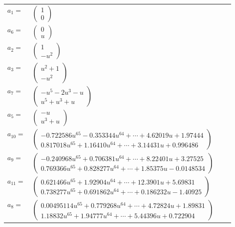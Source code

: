 \documentclass[1p]{elsarticle_modified}
\theoremstyle{definition}
\begin{document}
\begin{tabular}{m{7pt} m{180pt} m{7pt} m{180pt} }
\flushright $a_{1}=$&$\begin{pmatrix}1\\0\end{pmatrix}$ \\
\flushright $a_{6}=$&$\begin{pmatrix}0\\u\end{pmatrix}$ \\
\flushright $a_{2}=$&$\begin{pmatrix}1\\- u^2\end{pmatrix}$ \\
\flushright $a_{3}=$&$\begin{pmatrix}u^2+1\\- u^2\end{pmatrix}$ \\
\flushright $a_{7}=$&$\begin{pmatrix}- u^5-2 u^3- u\\u^5+u^3+u\end{pmatrix}$ \\
\flushright $a_{5}=$&$\begin{pmatrix}- u\\u^3+u\end{pmatrix}$ \\
\flushright $a_{10}=$&$\begin{pmatrix}-0.722586 u^{65}-0.353344 u^{64}+\cdots+4.62019 u+1.97444\\0.817018 u^{65}+1.16410 u^{64}+\cdots+3.14431 u+0.996486\end{pmatrix}$ \\
\flushright $a_{9}=$&$\begin{pmatrix}-0.240968 u^{65}+0.706381 u^{64}+\cdots+8.22401 u+3.27525\\0.769366 u^{65}+0.828277 u^{64}+\cdots+1.85375 u-0.0148534\end{pmatrix}$ \\
\flushright $a_{11}=$&$\begin{pmatrix}0.621466 u^{65}+1.92904 u^{64}+\cdots+12.3901 u+5.69831\\0.738277 u^{65}+0.691862 u^{64}+\cdots+0.186232 u-1.40925\end{pmatrix}$ \\
\flushright $a_{8}=$&$\begin{pmatrix}0.00495114 u^{65}+0.779268 u^{64}+\cdots+4.72824 u+1.89831\\1.18832 u^{65}+1.94777 u^{64}+\cdots+5.44396 u+0.722904\end{pmatrix}$ \\

\end{tabular}
\end{document}
